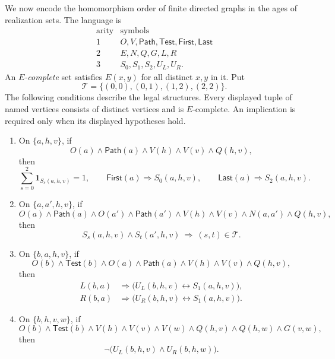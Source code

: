 \documentclass{article}
\numberwithin{equation}{section}
\theoremstyle{definition}
\begin{document}
We now encode the homomorphism order of finite directed graphs in the ages
of realization sets. The language is
\[
\begin{array}{c|l}
\text{arity}&\text{symbols}\\ \hline
1&O,V,\mathsf{Path},\mathsf{Test},\mathsf{First},\mathsf{Last}\\
2&E,N,Q,G,L,R\\
3&S_0,S_1,S_2,U_L,U_R.
\end{array}
\]
An \emph{$E$-complete} set satisfies $E(x,y)$ for all distinct $x,y$ in it.
Put
\[
 \mathcal T=\{(0,0),(0,1),(1,2),(2,2)\}.
\]
The following conditions describe the legal structures. Every displayed
tuple of named vertices consists of distinct vertices and is $E$-complete.
An implication is required only when its displayed hypotheses hold.
\begin{enumerate}
\item On $\{a,h,v\}$, if
\[
 O(a)\wedge\mathsf{Path}(a)\wedge V(h)\wedge V(v)\wedge Q(h,v),
\]
then
\begin{equation}\label{neg:states}
 \sum_{s=0}^{2}\mathbf1_{S_s(a,h,v)}=1,\qquad
 \mathsf{First}(a)\Rightarrow S_0(a,h,v),\qquad
 \mathsf{Last}(a)\Rightarrow S_2(a,h,v).
\end{equation}
\item On $\{a,a',h,v\}$, if
\[
 O(a)\wedge\mathsf{Path}(a)\wedge O(a')\wedge\mathsf{Path}(a')
 \wedge V(h)\wedge V(v)\wedge N(a,a')\wedge Q(h,v),
\]
then
\begin{equation}\label{neg:transition}
 S_s(a,h,v)\wedge S_t(a',h,v)\ \Rightarrow\ (s,t)\in\mathcal T.
\end{equation}
\item On $\{b,a,h,v\}$, if
\[
 O(b)\wedge\mathsf{Test}(b)\wedge O(a)\wedge\mathsf{Path}(a)
 \wedge V(h)\wedge V(v)\wedge Q(h,v),
\]
then
\begin{equation}\label{neg:copy-bits}
 \begin{aligned}
 L(b,a)&\Rightarrow\bigl(U_L(b,h,v)\leftrightarrow S_1(a,h,v)\bigr),\\
 R(b,a)&\Rightarrow\bigl(U_R(b,h,v)\leftrightarrow S_1(a,h,v)\bigr).
 \end{aligned}
\end{equation}
\item On $\{b,h,v,w\}$, if
\[
 O(b)\wedge\mathsf{Test}(b)\wedge V(h)\wedge V(v)\wedge V(w)
 \wedge Q(h,v)\wedge Q(h,w)\wedge G(v,w),
\]
then
\begin{equation}\label{neg:conflict}
 \neg\bigl(U_L(b,h,v)\wedge U_R(b,h,w)\bigr).
\end{equation}
\end{enumerate}
\end{document}
